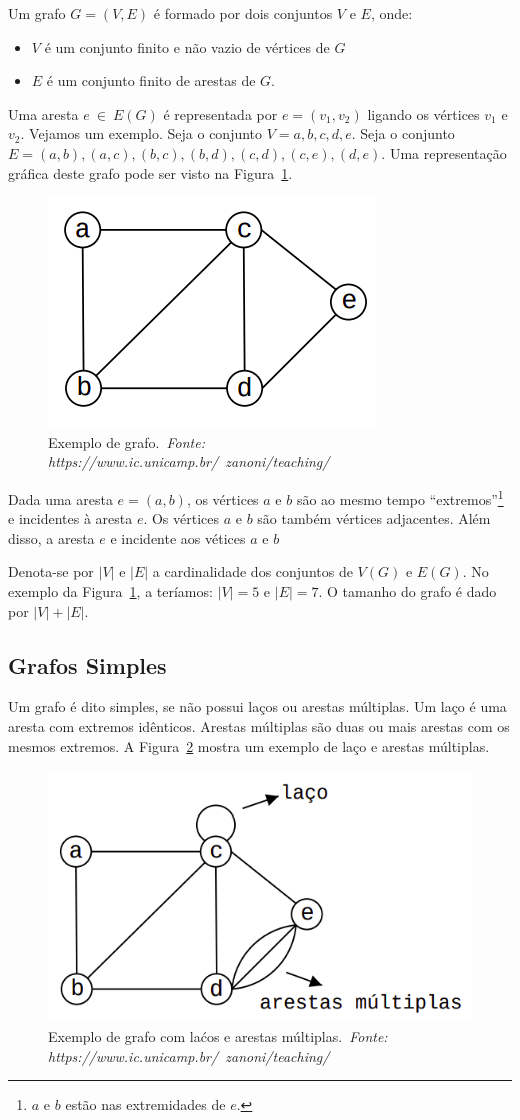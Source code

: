 \documentclass[11pt,fleqn]{book} %
\begin{document}
Um grafo $G = (V,E)$ é formado por dois conjuntos $V$ e $E$, onde:
\begin{itemize}
	\item $V$ é um conjunto finito e não vazio de vértices de $G$ 
	\item $E$ é um conjunto finito de arestas de $G$.
\end{itemize}

Uma aresta $e~\in~E(G)$ é representada por $e=(v_1, v_2)$ ligando os vértices $v_1$ e $v_2$.
Vejamos um exemplo. 
Seja o conjunto $V = {a, b, c, d, e}$. 
Seja o conjunto $E = {(a, b),(a, c),(b, c),(b, d),(c, d),(c, e),(d, e)}$. 
Uma representação gráfica deste grafo pode ser visto na Figura~\ref{Grafos01}.
\begin{figure}[htbp]
	\centering
	\includegraphics[width=.3\textwidth]{Pictures/Grafos01}
	\caption[Exemplo de grafo]{Exemplo de grafo.~\textit{Fonte: https://www.ic.unicamp.br/~zanoni/teaching/}}
	\label{Grafos01}
\end{figure}

Dada uma aresta $e = (a, b)$, os vértices  $a$ e $b$ são ao mesmo tempo ``extremos''\footnote{$a$ e $b$ estão nas extremidades de $e$.} e incidentes à aresta $e$. 
Os vértices $a$ e $b$ são também vértices adjacentes.
Além disso, a aresta $e$ e incidente aos vétices $a$ e $b$

Denota-se por $|V|$ e $|E|$ a cardinalidade dos conjuntos de $V(G)$ e $E(G)$. No exemplo da Figura~\ref{Grafos01}, a teríamos: $|V| = 5$ e $|E| = 7$.
O tamanho do grafo é dado por $|V| +|E|$.


\subsection{Grafos Simples}
Um grafo é dito simples, se não possui laços ou arestas múltiplas.
Um laço é uma aresta com extremos idênticos.
Arestas múltiplas são duas ou mais arestas com os mesmos extremos.
A Figura~\ref{Grafos02} mostra um exemplo de laço e arestas múltiplas.
\begin{figure}[htbp]
	\centering
	\includegraphics[width=.5\textwidth]{Pictures/Grafos02}
	\caption[Exemplo de grafo não simples]{Exemplo de grafo com la{\'c}os e arestas m{\'u}ltiplas.~\textit{Fonte: https://www.ic.unicamp.br/~zanoni/teaching/}}
	\label{Grafos02}
\end{figure}
\end{document}
